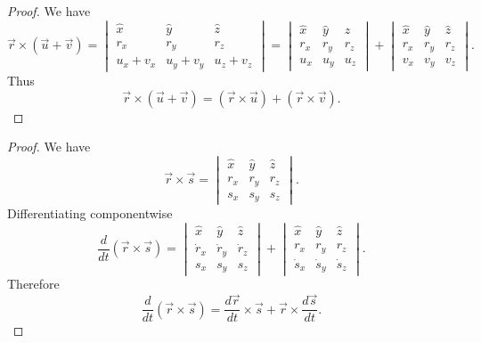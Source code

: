 \begin{proof}
    We have 
    \[\vec{r} \times (\vec{u} + \vec{v}) 
        = \begin{vmatrix}
            \hat{x} & \hat{y} & \hat{z} \\
            r_x & r_y & r_z \\
            u_x + v_x & u_y + v_y & u_z + v_z
        \end{vmatrix} = \begin{vmatrix}
            \hat{x} & \hat{y} & \hat{z} \\
            r_x & r_y & r_z \\
            u_x & u_y & u_z
        \end{vmatrix}
        +
        \begin{vmatrix}
            \hat{x} & \hat{y} & \hat{z} \\
            r_x & r_y & r_z \\
            v_x & v_y & v_z
        \end{vmatrix}.
    \]
    Thus
    \[
        \vec{r} \times (\vec{u} + \vec{v})
        = (\vec{r} \times \vec{u}) + (\vec{r} \times \vec{v}).
    \] 
\end{proof}

\begin{proof}
    We have
    \[
        \vec{r} \times \vec{s}
        =
        \begin{vmatrix}
            \hat{x} & \hat{y} & \hat{z} \\
            r_x & r_y & r_z \\
            s_x & s_y & s_z
        \end{vmatrix}.
    \]
    Differentiating componentwise
    \[
        \frac{d}{dt} (\vec{r} \times \vec{s})
        =
        \begin{vmatrix}
            \hat{x} & \hat{y} & \hat{z} \\
            \dot{r}_x & \dot{r}_y & \dot{r}_z \\
            s_x & s_y & s_z
        \end{vmatrix}
        +
        \begin{vmatrix}
            \hat{x} & \hat{y} & \hat{z} \\
            r_x & r_y & r_z \\
            \dot{s}_x & \dot{s}_y & \dot{s}_z
        \end{vmatrix}.
    \]
    Therefore
    \[
        \frac{d}{dt} (\vec{r} \times \vec{s})
        = \frac{d \vec{r}}{dt} \times \vec{s}
        + \vec{r} \times \frac{d \vec{s}}{dt}.
    \]
\end{proof}

